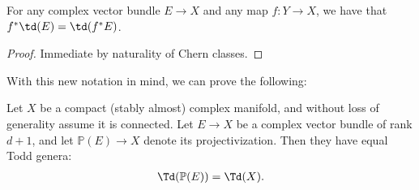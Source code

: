 \documentclass[11pt]{book}
\begin{document}
\begin{proposition}\label{prop:pullback-todd-class} 
For any complex vector bundle $E \to X$ and any map $f \colon Y \to X$, we have that $f^\ast \td(E) = \td(f^\ast E)$.
\end{proposition}
\begin{proof} Immediate by naturality of Chern classes.
\end{proof}

With this new notation in mind, we can prove the following:


\begin{proposition}\label{prop:todd-genus-projective-bundle} Let $X$ be a compact (stably almost) complex manifold, and without loss of generality assume it is connected. Let $E \to X$ be a complex vector bundle of rank $d+1$, and let $\mathbb{P}(E) \to X$ denote its projectivization. Then they have equal Todd genera:
\begin{align*}
    \Td(\mathbb{P}(E)) = \Td(X).
\end{align*}
\end{proposition}
\end{document}
